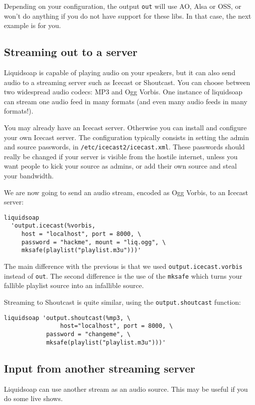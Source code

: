 \documentclass{book}
\begin{document}
Depending on your configuration, the output \verb+out+ will use AO, Alsa or OSS,
or won't do anything if you do not have support for these libs. In that case,
the next example is for you.

\subsection{Streaming out to a server}
Liquidsoap is capable of playing audio on your speakers, but it can also send
audio to a streaming server such as Icecast or Shoutcast. You can choose between
two widespread audio codecs: MP3 and Ogg Vorbis. One instance of liquidsoap can
stream one audio feed in many formats (and even many audio feeds in many
formats!).

You may already have an Icecast server. Otherwise you can install and configure
your own Icecast server. The configuration typically consists in setting the
admin and source passwords, in \verb+/etc/icecast2/icecast.xml+. These passwords
should really be changed if your server is visible from the hostile internet,
unless you want people to kick your source as admins, or add their own source
and steal your bandwidth.

We are now going to send an audio stream, encoded as Ogg Vorbis, to an Icecast
server:
\begin{verbatim}
liquidsoap
  'output.icecast(%vorbis,
     host = "localhost", port = 8000, \
     password = "hackme", mount = "liq.ogg", \
     mksafe(playlist("playlist.m3u")))'
\end{verbatim}
The main difference with the previous is that we used
\verb+output.icecast.vorbis+ instead of \verb+out+. The second difference is the
use of the \verb+mksafe+ which turns your fallible playlist source into an
infallible source.

Streaming to Shoutcast is quite similar, using the \verb+output.shoutcast+
function:

\begin{verbatim}
liquidsoap 'output.shoutcast(%mp3, \
                host="localhost", port = 8000, \
	        password = "changeme", \
	        mksafe(playlist("playlist.m3u")))'
\end{verbatim}

\subsection{Input from another streaming server}
Liquidsoap can use another stream as an audio source. This may be useful if you
do some live shows.
\end{document}
